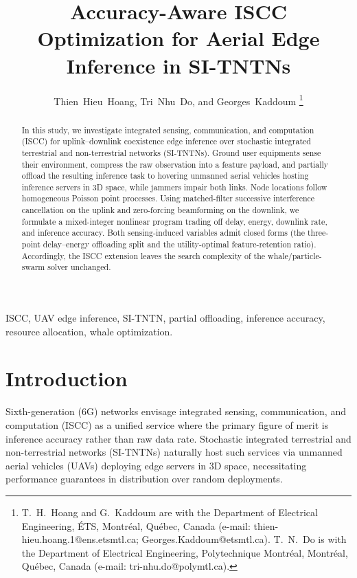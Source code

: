 \documentclass[journal]{IEEEtran}
\begin{document}
\title{Accuracy-Aware ISCC Optimization for Aerial Edge Inference in SI-TNTNs}

\author{Thien~Hieu~Hoang, Tri~Nhu~Do, and Georges~Kaddoum%
\thanks{T.~H.~Hoang and G.~Kaddoum are with the Department of Electrical Engineering, \'{E}TS, Montr\'{e}al, Qu\'{e}bec, Canada (e-mail: \mbox{thien-hieu.hoang.1@ens.etsmtl.ca}; \mbox{Georges.Kaddoum@etsmtl.ca}). T.~N.~Do is with the Department of Electrical Engineering, Polytechnique Montr\'{e}al, Montr\'{e}al, Qu\'{e}bec, Canada (e-mail: \mbox{tri-nhu.do@polymtl.ca}).}}
\maketitle

\begin{abstract}
In this study, we investigate integrated sensing, communication, and computation (ISCC) for uplink--downlink coexistence edge inference over stochastic integrated terrestrial and non-terrestrial networks (SI-TNTNs). Ground user equipments sense their environment, compress the raw observation into a feature payload, and partially offload the resulting inference task to hovering unmanned aerial vehicles hosting inference servers in 3D space, while jammers impair both links. Node locations follow homogeneous Poisson point processes. Using matched-filter successive interference cancellation on the uplink and zero-forcing beamforming on the downlink, we formulate a mixed-integer nonlinear program trading off delay, energy, downlink rate, and inference accuracy. Both sensing-induced variables admit closed forms (the three-point delay--energy offloading split and the utility-optimal feature-retention ratio). Accordingly, the ISCC extension leaves the search complexity of the whale/particle-swarm solver unchanged.
\end{abstract}

\begin{IEEEkeywords}
ISCC, UAV edge inference, SI-TNTN, partial offloading, inference accuracy, resource allocation, whale optimization.
\end{IEEEkeywords}

\section{Introduction}
{\color{blue}Sixth-generation (6G) networks envisage integrated sensing, communication, and computation (ISCC) as a unified service where the primary figure of merit is inference accuracy rather than raw data rate. Stochastic integrated terrestrial and non-terrestrial networks (SI-TNTNs) \cite{meftah2026sitntn} naturally host such services via unmanned aerial vehicles (UAVs) deploying edge servers in 3D space, necessitating performance guarantees in distribution over random deployments.}
\end{document}
